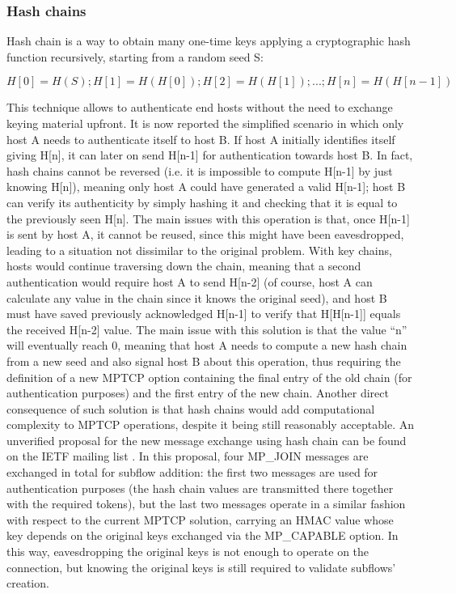\subsubsection{Hash chains}
Hash chain is a way to obtain many one-time keys applying a cryptographic hash function recursively, starting from a random seed S:
  
  \[H[0] = H(S); H[1] = H(H[0]); H[2] = H(H[1]); ...; H[n] = H(H[n-1])\]
  
This technique allows to authenticate end hosts without the need to exchange keying material upfront. It is now reported the simplified scenario in which only host A needs to authenticate itself to host B. If host A initially identifies itself giving H[n], it can later on send H[n-1] for authentication towards host B. In fact, hash chains cannot be reversed (i.e. it is impossible to compute H[n-1] by just knowing H[n]), meaning only host A could have generated a valid H[n-1]; host B can verify its authenticity by simply hashing it and checking that it is equal to the previously seen H[n].
  The main issues with this operation is that, once H[n-1] is sent by host A, it cannot be reused, since this might have been eavesdropped, leading to a situation not dissimilar to the original problem. With key chains, hosts would continue traversing down the chain, meaning that a second authentication would require host A to send H[n-2] (of course, host A can calculate any value in the chain since it knows the original seed), and host B must have saved previously acknowledged H[n-1] to verify that H[H[n-1]] equals the received H[n-2] value.
  The main issue with this solution is that the value ``n'' will eventually reach 0, meaning that host A needs to compute a new hash chain from a new seed and also signal host B about this operation, thus requiring the definition of a new MPTCP option containing the final entry of the old chain (for authentication purposes) and the first entry of the new chain.
  Another direct consequence of such solution is that hash chains would add computational complexity to MPTCP operations, despite it being still reasonably acceptable.
  An unverified proposal for the new message exchange using hash chain can be found on the IETF mailing list \cite{hashchain}.
In this proposal, four MP\_JOIN messages are exchanged in total for subflow addition: the first two messages are used for authentication purposes (the hash chain values are transmitted there together with the required tokens), but the last two messages operate in a similar fashion with respect to the current MPTCP solution, carrying an HMAC value whose key depends on the original keys exchanged via the MP\_CAPABLE option. In this way, eavesdropping the original keys is not enough to operate on the connection, but knowing the original keys is still required to validate subflows' creation.

